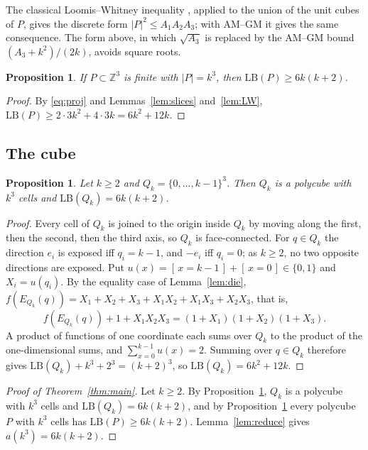 \documentclass[11pt]{amsart}
\theoremstyle{plain}
\newtheorem{proposition}[theorem]{Proposition}
\theoremstyle{definition}
\newcommand{\Z}{\mathbb{Z}}
\newcommand{\LB}{\mathrm{LB}}
\newcommand{\ind}[1]{[\,#1\,]}
\begin{document}
The classical Loomis--Whitney inequality \cite{LW}, applied to the union of the unit cubes of $P$, gives the discrete form $|P|^2\le A_1A_2A_3$; with AM--GM it gives the same consequence. The form above, in which $\sqrt{A_3}$ is replaced by the AM--GM bound $(A_3+k^2)/(2k)$, avoids square roots.

\begin{proposition}\label{prop:lower}
If $P\subset\Z^3$ is finite with $|P|=k^3$, then $\LB(P)\ge6k(k+2)$.
\end{proposition}

\begin{proof}
By \eqref{eq:proj} and Lemmas~\ref{lem:slices} and~\ref{lem:LW}, $\LB(P)\ge2\cdot3k^2+4\cdot3k=6k^2+12k$.
\end{proof}

\subsection{The cube}

\begin{proposition}\label{prop:cube}
Let $k\ge2$ and $Q_k=\{0,\dots,k-1\}^3$. Then $Q_k$ is a polycube with $k^3$ cells and $\LB(Q_k)=6k(k+2)$.
\end{proposition}

\begin{proof}
Every cell of $Q_k$ is joined to the origin inside $Q_k$ by moving along the first, then the second, then the third axis, so $Q_k$ is face-connected. For $q\in Q_k$ the direction $e_i$ is exposed iff $q_i=k-1$, and $-e_i$ iff $q_i=0$; as $k\ge2$, no two opposite directions are exposed. Put $u(x)=\ind{x=k-1}+\ind{x=0}\in\{0,1\}$ and $X_i=u(q_i)$. By the equality case of Lemma~\ref{lem:die}, $f(E_{Q_k}(q))=X_1+X_2+X_3+X_1X_2+X_1X_3+X_2X_3$, that is,
\[
f(E_{Q_k}(q))+1+X_1X_2X_3=(1+X_1)(1+X_2)(1+X_3).
\]
A product of functions of one coordinate each sums over $Q_k$ to the product of the one-dimensional sums, and $\sum_{x=0}^{k-1}u(x)=2$. Summing over $q\in Q_k$ therefore gives $\LB(Q_k)+k^3+2^3=(k+2)^3$, so $\LB(Q_k)=6k^2+12k$.
\end{proof}

\begin{proof}[Proof of Theorem~\ref{thm:main}]
Let $k\ge2$. By Proposition~\ref{prop:cube}, $Q_k$ is a polycube with $k^3$ cells and $\LB(Q_k)=6k(k+2)$, and by Proposition~\ref{prop:lower} every polycube $P$ with $k^3$ cells has $\LB(P)\ge6k(k+2)$. Lemma~\ref{lem:reduce} gives $a(k^3)=6k(k+2)$.
\end{proof}
\end{document}
